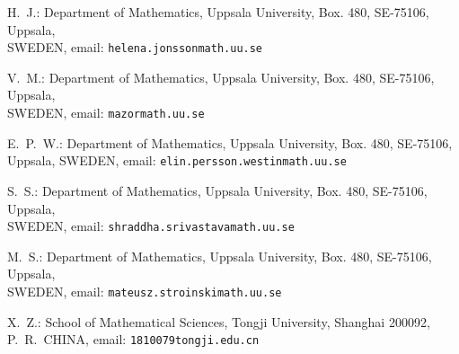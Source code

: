 \documentclass[a4paper]{amsart}
\begin{document}
\noindent
H.~J.: Department of Mathematics, Uppsala University, Box. 480,
SE-75106, Uppsala,\\ SWEDEN, email: {\tt helena.jonssonmath.uu.se}

\noindent
V.~M.: Department of Mathematics, Uppsala University, Box. 480,
SE-75106, Uppsala,\\ SWEDEN, email: {\tt mazormath.uu.se}

\noindent
E.~P.~W.: Department of Mathematics, Uppsala University, Box. 480,
SE-75106,\\ Uppsala, SWEDEN, email: {\tt elin.persson.westinmath.uu.se}

\noindent
S.~S.: Department of Mathematics, Uppsala University, Box. 480,
SE-75106, Uppsala,\\ SWEDEN, email: {\tt shraddha.srivastavamath.uu.se}

\noindent
M.~S.: Department of Mathematics, Uppsala University, Box. 480,
SE-75106, Uppsala,\\ SWEDEN, email: {\tt mateusz.stroinskimath.uu.se}

\noindent
X.~Z.: School of Mathematical Sciences, Tongji University,
Shanghai 200092,\\ P.~R.~CHINA, email: {\tt 1810079tongji.edu.cn}
\end{document}
